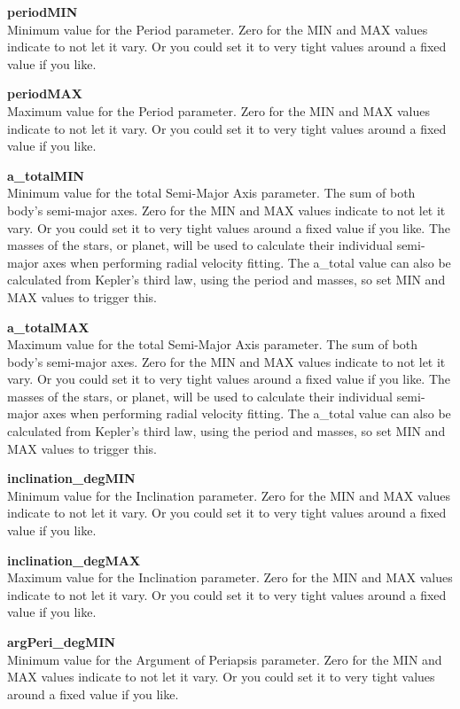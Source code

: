 \documentclass[12pt,preprint]{aastex}
\begin{document}
{\bf periodMIN}\\
Minimum value for the Period parameter.
Zero for the MIN and MAX values indicate to not let it vary.  Or you could set it to very tight values around a fixed value if you like.

{\bf periodMAX}\\
Maximum value for the Period parameter.
Zero for the MIN and MAX values indicate to not let it vary.  Or you could set it to very tight values around a fixed value if you like.

{\bf a\_totalMIN}\\
Minimum value for the total Semi-Major Axis parameter.  The sum of both body's semi-major axes.
Zero for the MIN and MAX values indicate to not let it vary.  Or you could set it to very tight values around a fixed value if you like.  The masses of the stars, or planet, will be used to calculate their individual semi-major axes when performing radial velocity fitting.  The a\_total value can also be calculated from Kepler's third law, using the period and masses, so set MIN and MAX values to trigger this. 

{\bf a\_totalMAX}\\
Maximum value for the total Semi-Major Axis parameter.  The sum of both body's semi-major axes.
Zero for the MIN and MAX values indicate to not let it vary.  Or you could set it to very tight values around a fixed value if you like.  The masses of the stars, or planet, will be used to calculate their individual semi-major axes when performing radial velocity fitting.  The a\_total value can also be calculated from Kepler's third law, using the period and masses, so set MIN and MAX values to trigger this. 

{\bf inclination\_degMIN}\\
Minimum value for the Inclination parameter.
Zero for the MIN and MAX values indicate to not let it vary.  Or you could set it to very tight values around a fixed value if you like.

{\bf inclination\_degMAX}\\
Maximum value for the Inclination parameter.
Zero for the MIN and MAX values indicate to not let it vary.  Or you could set it to very tight values around a fixed value if you like.

{\bf argPeri\_degMIN}\\
Minimum value for the Argument of Periapsis parameter.
Zero for the MIN and MAX values indicate to not let it vary.  Or you could set it to very tight values around a fixed value if you like.
\end{document}
